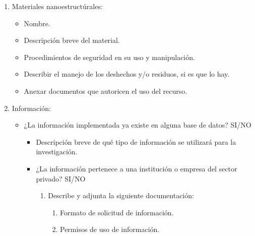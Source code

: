 \begin{enumerate}
	\item Materiales nanoestructúrales:
	\begin{itemize}
		\item Nombre.
		\item Descripción breve del material.
		\item Procedimientos de seguridad en su uso y manipulación.
		\item Describir el manejo de los deshechos y/o residuos, si es que lo hay.
		\item Anexar documentos que autoricen el uso del recurso.
	\end{itemize}
	
	\item Información:
	\begin{itemize}
		\item ¿La información implementada ya existe en alguna base de datos? SI/NO
		\begin{itemize}
			\item Descripción breve de qué tipo de información se utilizará para la investigación.
			\item ¿La información pertenece a una institución o empresa del sector privado? SI/NO
			\begin{enumerate}
				\item Describe y adjunta la siguiente documentación: 
				\begin{enumerate}
					\item Formato de solicitud de información.
					\item Permisos de uso de información.
				\end{enumerate}
			\end{enumerate}
		\end{itemize}
		

\end{itemize}
\end{enumerate}
